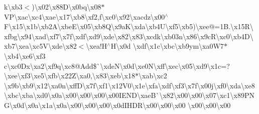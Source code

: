 \begin{DoxyCompactItemize}
k\textbackslash{}xb3$<$)\textbackslash{}x02\textbackslash{}x88\+D\textbackslash{}x0bq\textbackslash{}x08$\ast$\+V\+P\textbackslash{}xac\textbackslash{}xc4\textbackslash{}xae\textbackslash{}x17\textbackslash{}xb8\textbackslash{}xf2,f\textbackslash{}xc0\textbackslash{}x92\textbackslash{}xacdz\textbackslash{}x00$^\wedge$\+F\textbackslash{}x15\textbackslash{}x1b\textbackslash{}xb2\+A\textbackslash{}xbe\+E\textbackslash{}x05\textbackslash{}xb8\+Q\textbackslash{}x9a\+K\textbackslash{}xda\textbackslash{}xb4\+U\textbackslash{}xf5\textbackslash{}xb5)\textbackslash{}xee@=1\+B.\textbackslash{}x15\+R\textbackslash{}xfbg\textbackslash{}x94\textbackslash{}xad\textbackslash{}xf7\textbackslash{}x7f\textbackslash{}xdf\textbackslash{}xd9\textbackslash{}xde\textbackslash{}x82\textbackslash{}x83\textbackslash{}xcdk\textbackslash{}xb03n\textbackslash{}x86\textbackslash{}x9c\+R\textbackslash{}xc0\textbackslash{}xb4\+D\textbackslash{}xb7\textbackslash{}xea\textbackslash{}xc5\+V\textbackslash{}xde\textbackslash{}x82$<$\textbackslash{}xea!\+H$^\wedge$\+H\textbackslash{}x0d \textbackslash{}xdf\textbackslash{}x1c\textbackslash{}xbc\textbackslash{}xb9ym\textbackslash{}xa0\+W7$\ast$\textbackslash{}xb4\textbackslash{}xe6\textbackslash{}xf3 c\textbackslash{}xc0\+Dx\textbackslash{}xa2\textbackslash{}xf9q\textbackslash{}xc8@\+Add\$\`{}\textbackslash{}xde\+N\textbackslash{}x0d\textbackslash{}xe0\+N\textbackslash{}xff\textbackslash{}xec\textbackslash{}x05\textbackslash{}xd9\textbackslash{}x1c=?\textbackslash{}xee\textbackslash{}xf3\textbackslash{}xe5\textbackslash{}xfb\textbackslash{}x22\+Z\textbackslash{}xa0,\textbackslash{}x83\textbackslash{}xeb\textbackslash{}x18$\ast$\textbackslash{}xab\textbackslash{}xc2 \textbackslash{}x9b\textbackslash{}xb9\textbackslash{}x12\textbackslash{}xa0n\textbackslash{}xff\+D\textbackslash{}x7f\textbackslash{}xf1\textbackslash{}x12\+V0\textbackslash{}x1e\textbackslash{}xfa\textbackslash{}xdf\textbackslash{}xf3\textbackslash{}x7f\textbackslash{}x00j\textbackslash{}xf0\textbackslash{}xda\textbackslash{}xe8\textbackslash{}xbc\textbackslash{}xba\textbackslash{}xd0\textbackslash{}x0a\textbackslash{}x00\textbackslash{}x00\textbackslash{}x00\textbackslash{}x00\+I\+E\+N\+D\textbackslash{}xae\+B\`{}\textbackslash{}x82\textbackslash{}x00\textbackslash{}x00\textbackslash{}x07\textbackslash{}xc1\textbackslash{}x89\+P\+N\+G\textbackslash{}x0d\textbackslash{}x0a\textbackslash{}x1a\textbackslash{}x0a\textbackslash{}x00\textbackslash{}x00\textbackslash{}x00\textbackslash{}x0d\+I\+H\+D\+R\textbackslash{}x00\textbackslash{}x00\textbackslash{}x00 \textbackslash{}x00\textbackslash{}x00\textbackslash{}x00 
\end{DoxyCompactItemize}
